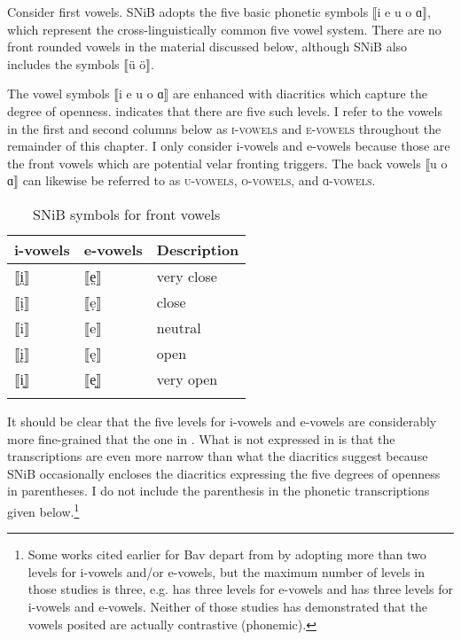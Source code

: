 Consider first vowels. SNiB adopts the five basic phonetic symbols ⟦i e u o ɑ⟧, which represent the cross-linguistically common five vowel system. There are no front rounded vowels in the material discussed below, although SNiB also includes the symbols ⟦ü ö⟧.

The vowel symbols ⟦i e u o ɑ⟧ are enhanced with diacritics which capture the degree of openness.  indicates that there are five such levels. I refer to the vowels in the first and second columns below as \textsc{i-vowels} and \textsc{e-vowels} throughout the remainder of this chapter. I only consider i-vowels and e-vowels because those are the front vowels which are potential velar fronting triggers. The back vowels ⟦u o ɑ⟧ can likewise be referred to as \textsc{u-vowels}, \textsc{o-vowels}, and \textsc{ɑ{}-vowels}.

\begin{table}
\caption{SNiB symbols for front vowels\label{tab:13.2}}
\begin{tabular}{lll}
\lsptoprule
i-vowels & e-vowels & Description\\\midrule
⟦i̤⟧       &  ⟦e̤⟧   &  very close\\
⟦ị⟧       &  ⟦ẹ⟧   &   close    \\
⟦i⟧        & ⟦e⟧     &  neutral   \\
⟦\k{i}⟧    & ⟦ę⟧     &  open      \\
⟦i͈⟧       &  ⟦e͈⟧   &     very open\\
\lspbottomrule
\end{tabular}
\end{table}

It should be clear that the five levels for i-vowels and e-vowels are considerably more fine-grained that the one in . What is not expressed in  is that the transcriptions are even more narrow than what the diacritics suggest because SNiB occasionally encloses the diacritics expressing the five degrees of openness in parentheses. I do not include the parenthesis in the phonetic transcriptions given below.\footnote{{Some works cited earlier for Bav depart from  by adopting more than two levels for i-vowels and/or e-vowels, but the maximum number of levels in those studies is three, e.g. \citet[X]{Kranzmayer1956} has three levels for e-vowels and \citet[1]{Wiesinger1970a} has three levels for i-vowels and e-vowels. Neither of those studies has demonstrated that the vowels posited are actually contrastive (phonemic).}}

